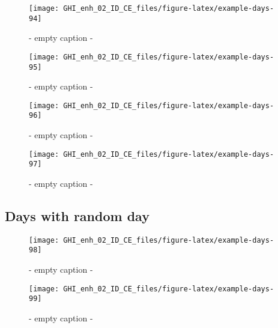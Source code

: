 \documentclass[
  10pt,
  a4paper,oneside]{article}
\begin{document}
\begin{figure}[H]

{\centering \texttt{[image: GHI\_enh\_02\_ID\_CE\_files/figure-latex/example-days-94]} 

}

\caption{ - empty caption - }\label{fig:example-days-94}
\end{figure}

\begin{figure}[H]

{\centering \texttt{[image: GHI\_enh\_02\_ID\_CE\_files/figure-latex/example-days-95]} 

}

\caption{ - empty caption - }\label{fig:example-days-95}
\end{figure}

\begin{figure}[H]

{\centering \texttt{[image: GHI\_enh\_02\_ID\_CE\_files/figure-latex/example-days-96]} 

}

\caption{ - empty caption - }\label{fig:example-days-96}
\end{figure}

\begin{figure}[H]

{\centering \texttt{[image: GHI\_enh\_02\_ID\_CE\_files/figure-latex/example-days-97]} 

}

\caption{ - empty caption - }\label{fig:example-days-97}
\end{figure}

\FloatBarrier

\hypertarget{days-with-random-day}{%
\subsection{Days with random day}\label{days-with-random-day}}

\begin{figure}[H]

{\centering \texttt{[image: GHI\_enh\_02\_ID\_CE\_files/figure-latex/example-days-98]} 

}

\caption{ - empty caption - }\label{fig:example-days-98}
\end{figure}

\begin{figure}[H]

{\centering \texttt{[image: GHI\_enh\_02\_ID\_CE\_files/figure-latex/example-days-99]} 

}

\caption{ - empty caption - }\label{fig:example-days-99}
\end{figure}
\end{document}
